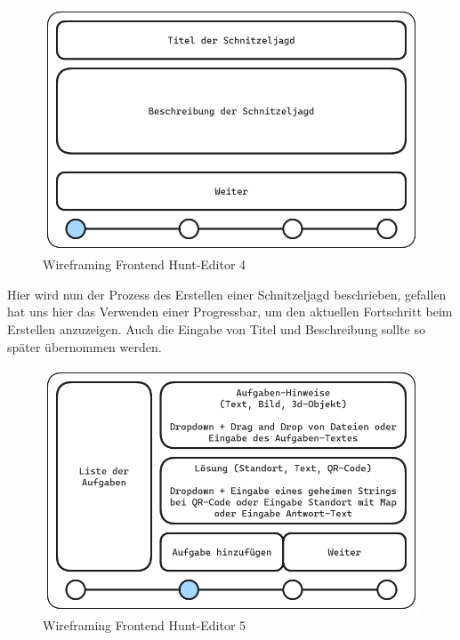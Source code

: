 \begin{figure}[H]
  \centering
  \includegraphics[width=1\textwidth]{images/wireframing/PrAr_Scavhunt_Wireframing-2.2.png}
  \caption{Wireframing Frontend Hunt-Editor 4}
  \label{fig:wireframing-frontend-hunt-editor-4}
\end{figure}

Hier wird nun der Prozess des Erstellen einer Schnitzeljagd beschrieben, gefallen hat uns hier das Verwenden einer Progressbar, um den aktuellen Fortschritt beim Erstellen anzuzeigen. Auch die Eingabe von Titel und Beschreibung sollte so später übernommen werden. 

\begin{figure}[H]
  \centering
  \includegraphics[width=1\textwidth]{images/wireframing/PrAr_Scavhunt_Wireframing-2.3.png}
  \caption{Wireframing Frontend Hunt-Editor 5}
  \label{fig:wireframing-frontend-hunt-editor-5}
\end{figure}

